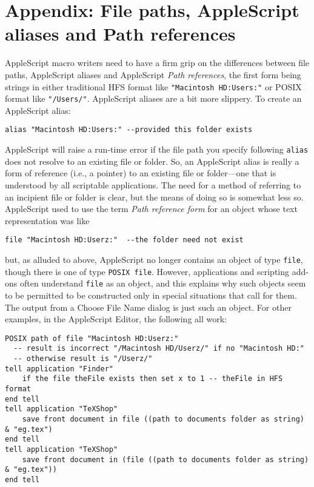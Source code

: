 \documentclass[11pt]{amsart}
\begin{document}
\section{Appendix: File paths, AppleScript aliases and Path references}
AppleScript macro writers need to have a firm grip on the differences between file paths, AppleScript aliases and AppleScript \emph{Path references}, the first form being strings in either traditional HFS format like \verb|"Macintosh HD:Users:"| or POSIX format like \verb|"/Users/"|. AppleScript aliases are a bit more slippery. To create an AppleScript alias:
\begin{verbatim}
alias "Macintosh HD:Users:" --provided this folder exists
\end{verbatim}
AppleScript will raise a run-time error if the file path you specify following {\tt alias} does not resolve to an existing file or folder. So, an AppleScript alias is really a form of reference (i.e., a pointer) to an existing file or folder---one that is understood by all scriptable applications. The need for a method of referring to  an incipient file or folder is clear, but the means of doing so is somewhat less so. AppleScript  used to use the term \emph{Path reference form} for an object whose text representation was like
\begin{verbatim}
file "Macintosh HD:Userz:"  --the folder need not exist
\end{verbatim}
but, as alluded to above, AppleScript no longer contains an object  of type {\tt file}, though there is one of type {\tt POSIX file}. However, applications and scripting add-ons often understand {\tt file} as an object, and this explains why such objects  seem to be permitted to be constructed only in special situations that call for them. The output from a Choose File Name dialog is just such an object. For other examples, in the AppleScript Editor, the following all work:
\begin{verbatim}
POSIX path of file "Macintosh HD:Userz:" 
  -- result is incorrect "/Macintosh HD/Userz/" if no "Macintosh HD:"
  -- otherwise result is "/Userz/"
tell application "Finder"
    if the file theFile exists then set x to 1 -- theFile in HFS format
end tell
tell application "TeXShop"
    save front document in file ((path to documents folder as string) & "eg.tex")
end tell
tell application "TeXShop"
    save front document in (file ((path to documents folder as string) & "eg.tex"))
end tell
\end{verbatim}
\end{document}
